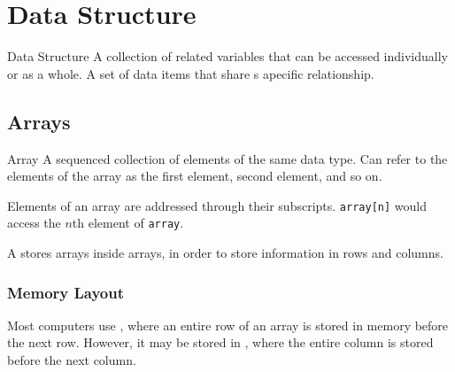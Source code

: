 \documentclass[\main/notes.tex]{subfiles}
\begin{document}
	\ifSubfilesClassLoaded{\setcounter{chapter}{10}}{}
	\chapter{Data Structure}
		\begin{definition}{Data Structure}
			A collection of related variables that can be accessed individually or as a whole. A set of data items that share s apecific relationship.
		\end{definition}
		\section{Arrays}
			\begin{definition}{Array}
				A sequenced collection of elements of the same data type. Can refer to the elements of the array as the first element, second element, and so on.

				Elements of an array are addressed through their subscripts. \texttt{array[n]} would access the $n$th element of \texttt{array}.
			\end{definition}
			A  stores arrays inside arrays, in order to store information in rows and columns.
			\subsection{Memory Layout}
				Most computers use , where an entire row of an array is stored in memory before the next row. However, it may be stored in , where the entire column is stored before the next column.
\end{document}

